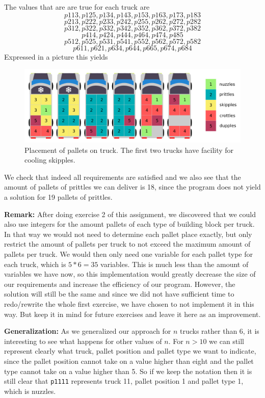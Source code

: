 \documentclass[a4paper]{article}
\begin{document}
The values that are are true for each truck are 
\[p113, p125, p134, p143, p153, p163, p173, p183 \]
\[p213, p222, p233, p242, p255, p262, p272, p282 \]
\[p312, p322, p332, p342, p352, p362, p372, p382 \]
\[p414, p424, p444, p464, p474, p485 \]
\[p512, p525, p531, p541, p552, p562, p572, p582 \]
\[p611, p621, p634, p644, p665, p674, p684 \]
Expressed in a picture this yields

\begin{figure}[H]
			\centering
				\includegraphics[scale=1]{trucks.png}
			\caption{Placement of pallets on truck. The first two trucks have facility for cooling skipples.}
		\end{figure}

We check that indeed all requirements are satisfied and we also see that the amount of pallets of prittles we can deliver is 18, since the program does not yield a solution for 19 pallets of prittles.

{\bf Remark:}
After doing exercise 2 of this assignment, we discovered that we could also use integers for the amount pallets of each type of building block per truck. In that way we would not need to determine each pallet place exactly, but only restrict the amount of pallets per truck to not exceed the maximum amount of pallets per truck. We would then only need one variable for each pallet type for each truck, which is $5*6=35$ variables. This is much less than the amount of variables we have now, so this implementation would greatly decrease the size of our requirements and increase the efficiency of our program. However, the solution will still be the same and since we did not have sufficient time to redo/rewrite the whole first exercise, we have chosen to not implement it in this way. But keep it in mind for future exercises and leave it here as an improvement.

\vspace{3mm}

{\bf Generalization:} 
As we generalized our approach for $n$ trucks rather than 6, it is
interesting to see what happens for other values of $n$. For $n
> 10$ we can still represent clearly what truck, pallet position and pallet type we want to indicate, since the pallet position cannot take on a value higher than eight and the pallet type cannot take on a value higher than 5. So if we keep the notation then it is still clear that {\tt p1111} represents truck 11, pallet position 1 and pallet type 1, which is nuzzles.
\end{document}
